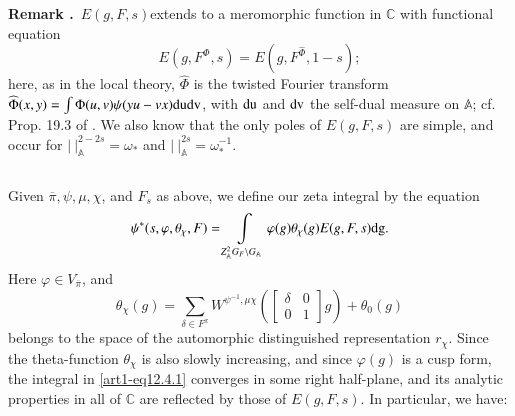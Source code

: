 \medskip
\noindent
{\bf Remark .\label{art1-rem12.3}}~$E(g,F,s)$\pageoriginale extends to a meromorphic function in $\mathbb{C}$ with functional equation
\setcounter{equation}{0}
\begin{equation}
E(g,F^{\Phi},s)=E(g,F^{\widehat{\Phi}},1-s);\label{art1-eq12.3.1}
\end{equation}
here, as in the local theory, $\widehat{\Phi}$ is the twisted Fourier transform $\widehat{\Phi}(x,y)=\int\Phi(u,v)\psi(yu-vx)\mathrm{du} \mathrm{dv}$, with $\mathrm{du}$ and $\mathrm{dv}$ the self-dual measure on $\mathbb{A}$; cf. Prop. 19.3 of \cite{Ja}. We also know that the only poles of $E(g,F,s)$ are simple, and occur for $|~|^{2-2s}_{\mathbb{A}}=\omega_{*}$ and $|~|^{2s}_{\mathbb{A}}=\omega^{-1}_{*}$.

\setcounter{subsection}{3}
\subsection{}\label{art1-sec12.4}
Given $\overline{\pi},\psi,\mu,\chi$, and $F_{s}$ as above, we define our zeta integral by the equation
\setcounter{equation}{0}
\begin{equation}
\psi^{*}(s,\varphi,\theta_{\chi},F)=\int\limits_{Z^{2}_{\mathbb{A}}G_{F}\backslash G_{\mathbb{A}}}\varphi(g)\theta_{\chi}(g)E(g,F,s)\mathrm{dg}.\label{art1-eq12.4.1}
\end{equation}
Here $\varphi\in V_{\overline{\pi}}$, and
\begin{equation}
\theta_{\chi}(g)=\sum\limits_{\delta\in F^{x}}W^{\psi^{-1},\mu\chi}\left(\begin{bmatrix} \delta & 0\\ 0 & 1\end{bmatrix}g\right)+\theta_{0}(g)\label{art1-eq12.4.2}
\end{equation}
belongs to the space of the automorphic distinguished representation $r_{\chi}$. Since the theta-function $\theta_{\chi}$ is also slowly increasing, and since $\varphi(g)$ is a cusp form, the integral in \eqref{art1-eq12.4.1} converges in some right half-plane, and its analytic properties in all of $\mathbb{C}$ are reflected by those of $E(g,F,s)$. In particular, we have:

